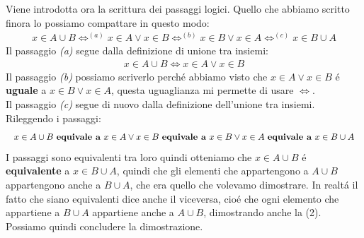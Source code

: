 \documentclass[twoside]{article} %
\begin{document}
	Viene introdotta ora la scrittura dei passaggi logici. Quello che abbiamo scritto finora lo possiamo compattare in questo modo:
	\begin{gather*}
		x\in A\cup B\Leftrightarrow ^{(a)} x\in A\vee x\in B\Leftrightarrow ^{(b)}x\in B\vee x\in A\Leftrightarrow ^{(c)}x\in B \cup A
	\end{gather*}
	Il passaggio \textit{(a)} segue dalla definizione di unione tra insiemi:
	\begin{gather*}
		x\in A\cup B\Leftrightarrow x\in A \vee x\in B
	\end{gather*} 	
 	Il passaggio \textit{(b)} possiamo scriverlo perch\'e abbiamo visto che $x\in A\vee x\in B$ \'e \textbf{uguale} a $x\in B \vee x\in A$, questa uguaglianza mi permette di usare $\Leftrightarrow$.\\
 	Il passaggio \textit{(c)} segue di nuovo dalla definizione dell'unione tra insiemi. 	Rileggendo i passaggi:
		\begin{align*}
			\resizebox{\hsize}{!}{$x\in A\cup B\text{ \textbf{equivale a} } x\in A\vee x\in B\text{ \textbf{equivale a} }x\in B\vee x\in A\text{ \textbf{equivale a} }x\in B \cup A$}
		\end{align*}	
	I passaggi sono equivalenti tra loro quindi otteniamo che $x\in A\cup B$ \'e \textbf{equivalente} a $x\in B \cup A$, quindi che gli elementi che appartengono a $A\cup B$ appartengono anche a $B\cup A$, che era quello che volevamo dimostrare. In realt\'a il fatto che siano equivalenti dice anche il viceversa, cio\'e che ogni elemento che appartiene a $B\cup A$ appartiene anche a $A\cup B$, dimostrando anche la (2). Possiamo quindi concludere la dimostrazione.
	\newpage	
	
\end{document}
